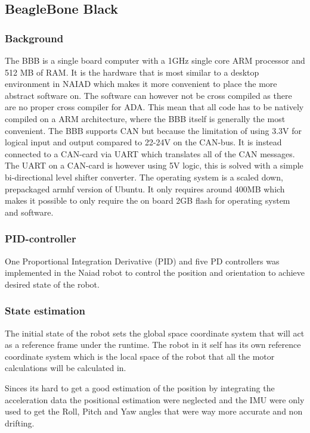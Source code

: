 \subsection{BeagleBone Black} %
		\subsubsection{Background} %
The BBB is a single board computer with a 1GHz single core ARM processor and 512 MB of RAM. It is the hardware that is most similar to a desktop environment in NAIAD which makes it more convenient to place the more abstract software on. The software can however not be cross compiled as there are no proper cross compiler for ADA. This mean that all code has to be natively compiled on a ARM architecture, where the BBB itself is generally the most convenient. The BBB supports CAN but because the limitation of using 3.3V for logical input and output compared to 22-24V on the CAN-bus. It is instead connected to a CAN-card via UART which translates all of the CAN messages. The UART on a CAN-card is however using 5V logic, this is solved with a simple bi-directional level shifter converter. The operating system is a scaled down, prepackaged armhf\cite{armhf} version of Ubuntu. It only requires around 400MB which makes it possible to only require the on board 2GB flash for operating system and software.

		\subsubsection{PID-controller} %
\noindent 
One Proportional Integration Derivative (PID) and five PD controllers was implemented in the Naiad robot to control the position and orientation to achieve desired state of the robot.
\subsubsection*{State estimation}
The initial state of the robot sets the global space coordinate system that will act as a reference frame under the runtime. The robot in it self has its own reference coordinate system which is the local space of the robot that all the motor calculations will be calculated in.

Sinces its hard to get a good estimation of the position by integrating the acceleration data the positional estimation were neglected and the IMU were only used to get the Roll, Pitch and Yaw angles that were way more accurate and non drifting.

